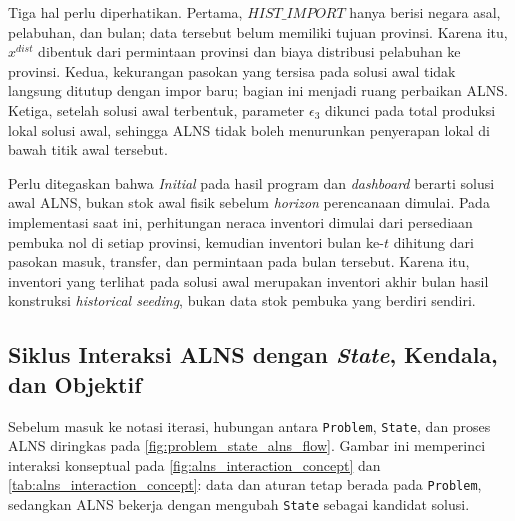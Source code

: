 \documentclass{file/TA-ITS}
\theoremstyle{definition}
\theoremstyle{definition}
\theoremstyle{plain}
\begin{document}
Tiga hal perlu diperhatikan. Pertama, \(HIST\_IMPORT\) hanya berisi negara asal, pelabuhan, dan bulan; data tersebut belum memiliki tujuan provinsi. Karena itu, \(x^{dist}\) dibentuk dari permintaan provinsi dan biaya distribusi pelabuhan ke provinsi. Kedua, kekurangan pasokan yang tersisa pada solusi awal tidak langsung ditutup dengan impor baru; bagian ini menjadi ruang perbaikan ALNS. Ketiga, setelah solusi awal terbentuk, parameter \(\epsilon_3\) dikunci pada total produksi lokal solusi awal, sehingga ALNS tidak boleh menurunkan penyerapan lokal di bawah titik awal tersebut.

Perlu ditegaskan bahwa \textit{Initial} pada hasil program dan \textit{dashboard} berarti solusi awal ALNS, bukan stok awal fisik sebelum \textit{horizon} perencanaan dimulai. Pada implementasi saat ini, perhitungan neraca inventori dimulai dari persediaan pembuka nol di setiap provinsi, kemudian inventori bulan ke-$t$ dihitung dari pasokan masuk, transfer, dan permintaan pada bulan tersebut. Karena itu, inventori yang terlihat pada solusi awal merupakan inventori akhir bulan hasil konstruksi \textit{historical seeding}, bukan data stok pembuka yang berdiri sendiri.

\subsection{Siklus Interaksi ALNS dengan \textit{State}, Kendala, dan Objektif}

Sebelum masuk ke notasi iterasi, hubungan antara \texttt{Problem}, \texttt{State}, dan proses ALNS diringkas pada \ref{fig:problem_state_alns_flow}. Gambar ini memperinci interaksi konseptual pada \ref{fig:alns_interaction_concept} dan \ref{tab:alns_interaction_concept}: data dan aturan tetap berada pada \texttt{Problem}, sedangkan ALNS bekerja dengan mengubah \texttt{State} sebagai kandidat solusi.
\end{document}

